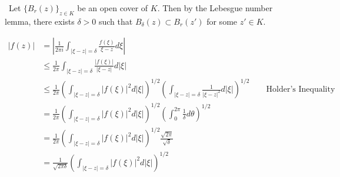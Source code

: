 \documentclass[12pt]{Qual}
\begin{document}
\begin{solution}$\,$
Let $\{B_r(z)\}_{z\in K}$ be an open cover of $K$. Then by the Lebesgue number lemma, there exists $\delta>0$ such that $B_\delta(z)\subset B_r(z')$ for some $z'\in K$.

\begin{align*}
    |f(z)|&=\left|\frac{1}{2\pi i}\int_{|\xi-z|=\delta}\frac{f(\xi)}{\xi-z}d\xi\right|\\
    &\le \frac{1}{2\pi}\int_{|\xi-z|=\delta}\frac{|f(\xi)|}{|\xi-z|}d|\xi|\\
    &\le \frac{1}{2\pi}\left(\int_{|\xi-z|=\delta}|f(\xi)|^2d|\xi|\right)^{1/2}\left(\int_{|\xi-z|=\delta}\frac{1}{|\xi-z|^2}d|\xi|\right)^{1/2}\qquad\text{Holder's Inequality}\\
    &=\frac{1}{2\pi}\left(\int_{|\xi-z|=\delta}|f(\xi)|^2d|\xi|\right)^{1/2}\left(\int_0^{2\pi}\frac{1}{\delta}d\theta\right)^{1/2}\\
    &=\frac{1}{2\pi}\left(\int_{|\xi-z|=\delta}|f(\xi)|^2d|\xi|\right)^{1/2}\frac{\sqrt{2\pi}}{\sqrt{\delta}}\\
    &=\frac{1}{\sqrt{2\pi\delta}}\left(\int_{|\xi-z|=\delta}|f(\xi)|^2d|\xi|\right)^{1/2}
\end{align*}

\end{solution}
\end{document}
